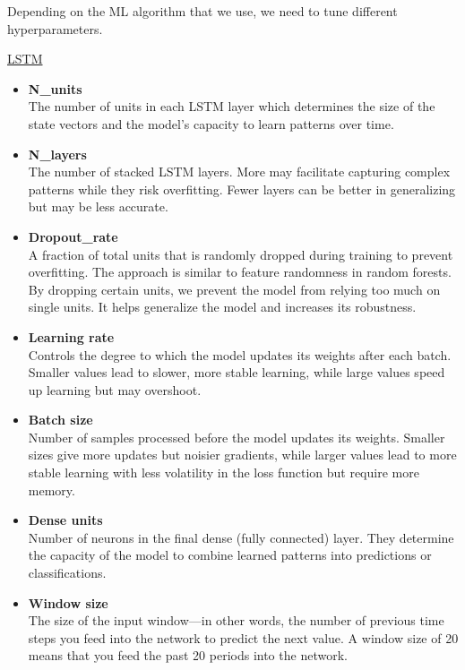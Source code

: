 \documentclass[a4paper,12pt]{report}
\begin{document}
Depending on the ML algorithm that we use, we need to tune different hyperparameters.\\
\begin{minipage}{\textwidth}
\underline{LSTM}
\begin{itemize}
  \item \textbf{N\_units} \\
  The number of units in each LSTM layer which determines the size of the state vectors and the model’s capacity to learn patterns over time.

  \item \textbf{N\_layers} \\
  The number of stacked LSTM layers. More may facilitate capturing complex patterns while they risk overfitting. Fewer layers can be better in generalizing but may be less accurate.

\end{itemize}
\end{minipage}
\begin{itemize}

  \item \textbf{Dropout\_rate} \\
  A fraction of total units that is randomly dropped during training to prevent overfitting. The approach is similar to feature randomness in random forests. By dropping certain units, we prevent the model from relying too much on single units. It helps generalize the model and increases its robustness.

  \item \textbf{Learning rate} \\
  Controls the degree to which the model updates its weights after each batch. Smaller values lead to slower, more stable learning, while large values speed up learning but may overshoot.

  \item \textbf{Batch size} \\
  Number of samples processed before the model updates its weights. Smaller sizes give more updates but noisier gradients, while larger values lead to more stable learning with less volatility in the loss function but require more memory.

  \item \textbf{Dense units} \\
  Number of neurons in the final dense (fully connected) layer. They determine the capacity of the model to combine learned patterns into predictions or classifications.

  \item \textbf{Window size} \\
  The size of the input window—in other words, the number of previous time steps you feed into the network to predict the next value. A window size of 20 means that you feed the past 20 periods into the network.
\end{itemize}
\end{document}
